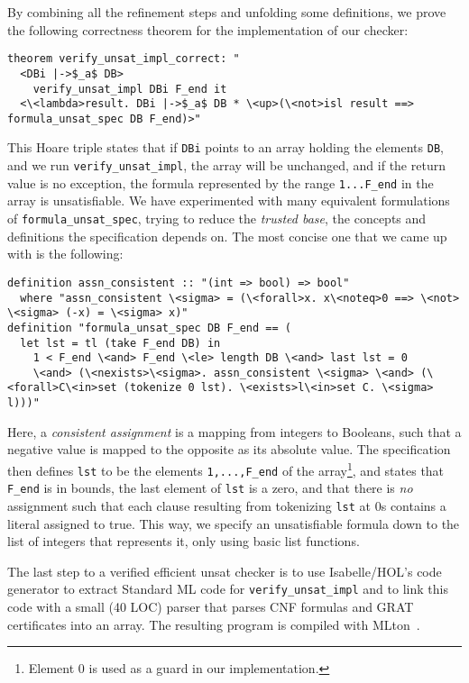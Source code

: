 \documentclass{llncs}
\newcommand{\isai}{\lstinline[language=isabelle,basicstyle=\normalsize\ttfamily\slshape]}
\begin{document}
By combining all the refinement steps and unfolding some definitions, we prove the following correctness theorem for the implementation of our checker:
\begin{lstlisting}
theorem verify_unsat_impl_correct: "
  <DBi |->$_a$ DB> 
    verify_unsat_impl DBi F_end it 
  <\<lambda>result. DBi |->$_a$ DB * \<up>(\<not>isl result ==> formula_unsat_spec DB F_end)>"
\end{lstlisting}
This Hoare triple states that if \isai$DBi$ points to an array holding the elements \isai$DB$,
and we run \isai$verify_unsat_impl$, the array will be unchanged, and if the return value is no exception,
the formula represented by the range \isai$1...F_end$ in the array is unsatisfiable. 
We have experimented with many equivalent formulations of \isai{formula_unsat_spec}, trying to reduce the \emph{trusted base}, 
\ie the concepts and definitions the specification depends on. The most concise one that we came up with is the following:
\begin{lstlisting}
definition assn_consistent :: "(int => bool) => bool"
  where "assn_consistent \<sigma> = (\<forall>x. x\<noteq>0 ==> \<not> \<sigma> (-x) = \<sigma> x)"
definition "formula_unsat_spec DB F_end == (
  let lst = tl (take F_end DB) in
    1 < F_end \<and> F_end \<le> length DB \<and> last lst = 0 
    \<and> (\<nexists>\<sigma>. assn_consistent \<sigma> \<and> (\<forall>C\<in>set (tokenize 0 lst). \<exists>l\<in>set C. \<sigma> l)))"
\end{lstlisting}
Here, a \emph{consistent assignment} is a mapping from integers to Booleans, such that a negative value is mapped to the opposite as its absolute value.
The specification then defines \isai$lst$ to be the elements \isai$1,...,F_end$ of the array\footnote{Element $0$ is used as a guard in our implementation.}, and
states that \isai$F_end$ is in bounds, the last element of \isai$lst$ is a zero, and that there is \emph{no} assignment such that each clause resulting 
from tokenizing \isai$lst$ at $0$s contains a literal assigned to true. 
This way, we specify an unsatisfiable formula down to the list of integers that represents it, only using basic list functions.

The last step to a verified efficient unsat checker is to use Isabelle/HOL's code generator to extract Standard ML code for \isai{verify_unsat_impl} and to
link this code with a small (40 LOC) parser that parses CNF formulas and GRAT certificates into an array. The resulting program is compiled with MLton~\cite{MLton}.
\end{document}
